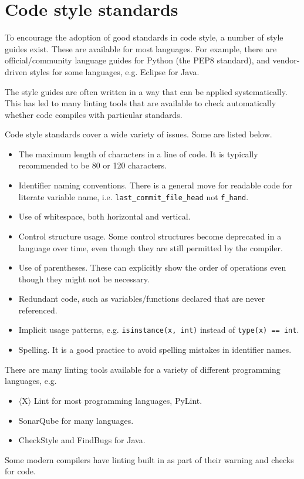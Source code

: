 \documentclass[a4paper, openany]{memoir}
\begin{document}
\section{Code style standards}
To encourage the adoption of good standards in code style, a number of style guides exist. These are available for most languages. For example, there are official/community language guides for Python (the PEP8 standard), and vendor-driven styles for some languages, e.g. Eclipse for Java. 

The style guides are often written in a way that can be applied systematically. This has led to many linting tools that are available to check automatically whether code compiles with particular standards.

Code style standards cover a wide variety of issues. Some are listed below.
\begin{itemize}
    \item The maximum length of characters in a line of code. It is typically recommended to be 80 or 120 characters.
    
    \item Identifier naming conventions. There is a general move for readable code for literate variable name, i.e. \texttt{last\_commit\_file\_head} not \texttt{f\_hand}.
    
    \item Use of whitespace, both horizontal and vertical.
    
    \item Control structure usage. Some control structures become deprecated in a language over time, even though they are still permitted by the compiler.
    
    \item Use of parentheses. These can explicitly show the order of operations even though they might not be necessary.
    
    \item Redundant code, such as variables/functions declared that are never referenced.
    
    \item Implicit usage patterns, e.g. \texttt{isinstance(x, int)} instead of \texttt{type(x) == int}.
    
    \item Spelling. It is a good practice to avoid spelling mistakes in identifier names.
\end{itemize}

There are many linting tools available for a variety of different programming languages, e.g.
\begin{itemize}
    \item $\langle$X$\rangle$ Lint for most programming languages, PyLint.
    \item SonarQube for many languages.
    \item CheckStyle and FindBugs for Java.
\end{itemize}
Some modern compilers have linting built in as part of their warning and checks for code.
\end{document}
